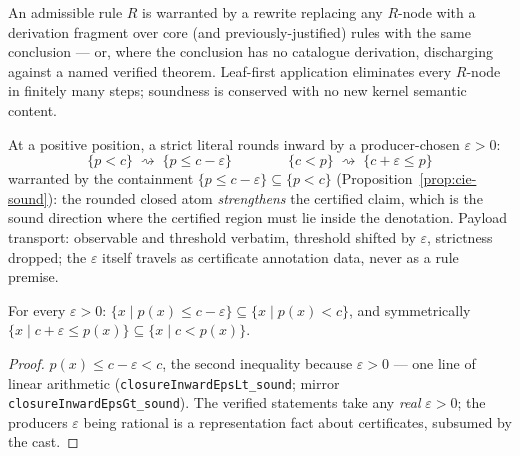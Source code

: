 

\begin{brecipe}\label{rec:cie-template}
An admissible rule $R$ is warranted by a rewrite replacing any
$R$-node with a derivation fragment over core (and
previously-justified) rules with the same conclusion --- or, where the
conclusion has no catalogue derivation, discharging against a named
verified theorem. Leaf-first application eliminates every $R$-node in
finitely many steps; soundness is conserved with no new kernel
semantic content.
\end{brecipe}

\begin{brecipe}
\label{rec:cie-instance}
At a positive position, a strict literal rounds inward by a
producer-chosen $\varepsilon > 0$:
\[
\{p < c\} \;\rightsquigarrow\; \{p \le c - \varepsilon\}
\qquad\qquad
\{c < p\} \;\rightsquigarrow\; \{c + \varepsilon \le p\}
\]
warranted by the containment
$\{p \le c - \varepsilon\} \subseteq \{p < c\}$
(Proposition~\ref{prop:cie-sound}): the rounded closed atom
\emph{strengthens} the certified claim, which is the sound direction
where the certified region must lie inside the denotation. Payload
transport: observable and threshold verbatim, threshold shifted by
$\varepsilon$, strictness dropped; the $\varepsilon$ itself travels
as certificate annotation data, never as a rule premise.
\end{brecipe}

\begin{bprop}\label{prop:cie-sound}
For every $\varepsilon > 0$:
$\{x \mid p(x) \le c - \varepsilon\} \subseteq \{x \mid p(x) < c\}$,
and symmetrically
$\{x \mid c + \varepsilon \le p(x)\} \subseteq \{x \mid c < p(x)\}$.
\end{bprop}
\begin{proof}
$p(x) \le c - \varepsilon < c$, the second inequality because
$\varepsilon > 0$ --- one line of linear arithmetic
(\texttt{closureInwardEpsLt\_sound}; mirror
\texttt{closureInwardEpsGt\_sound}). The verified statements take any
\emph{real} $\varepsilon > 0$; the producer\textquotesingle s
$\varepsilon$ being rational is a representation fact about
certificates, subsumed by the cast.
\end{proof}

